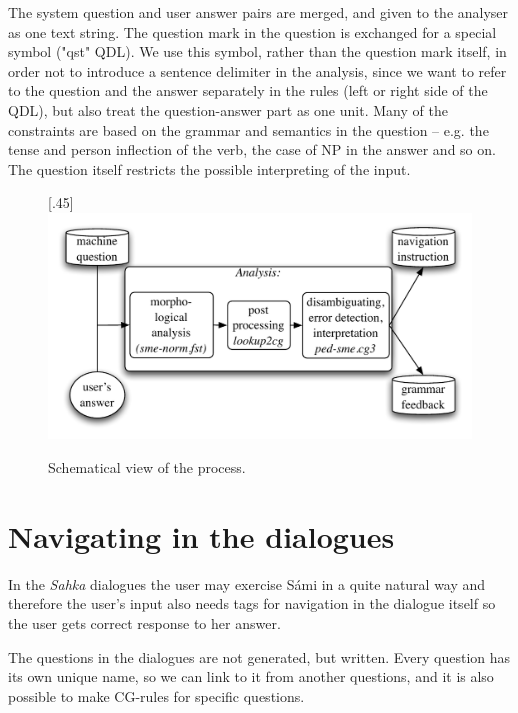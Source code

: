 \documentclass[11pt]{article}
\begin{document}
The system question and user answer pairs are merged, and given to the analyser as one text string. The question mark in the question is exchanged for a special symbol ("qst" QDL). We use this symbol, rather than the question mark itself, in order not to introduce a sentence delimiter in the analysis, since we want to refer to the question and the answer separately in the rules (left or right side of the QDL), but also treat the question-answer part as one unit. Many of the constraints are based on the grammar and semantics in the question -- e.g. the tense and person inflection of the verb, the case of NP in the answer and so on. The question itself restricts the possible interpreting of the input. \\


\begin{figure}[htbp]
\begin{center}
\scalebox{.45}[.45]{\includegraphics{presentation/img/qa2.pdf}}\\
\caption{Schematical view of the process.}
\end{center}
\end{figure}


\section{Navigating in the dialogues}
In the \textit{Sahka} dialogues the user may exercise Sámi in a quite natural way and therefore the user's input also needs tags for navigation in the dialogue itself so the user gets correct response to her answer.

The questions in the dialogues are not generated, but written. Every question has its own unique name, so we can link to it from another questions, and it is also possible to make CG-rules for specific questions.  
\end{document}
